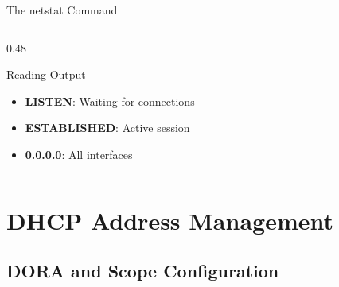 \documentclass[aspectratio=169]{beamer}  %
\begin{document}
\begin{frame}{The netstat Command}
\begin{columns}[T]
\begin{column}{0.48\textwidth}
            \vspace{0.2em}
            \begin{exampleblock}{Reading Output}
                \small
                \begin{itemize}\setlength{\itemsep}{1pt}
                    \item \textbf{LISTEN}: Waiting for connections
                    \item \textbf{ESTABLISHED}: Active session
                    \item \textbf{0.0.0.0}: All interfaces
                \end{itemize}
            \end{exampleblock}
        \end{column}
    \end{columns}
\end{frame}

\section{DHCP Address Management}
\subsection{DORA and Scope Configuration}

\end{document}
